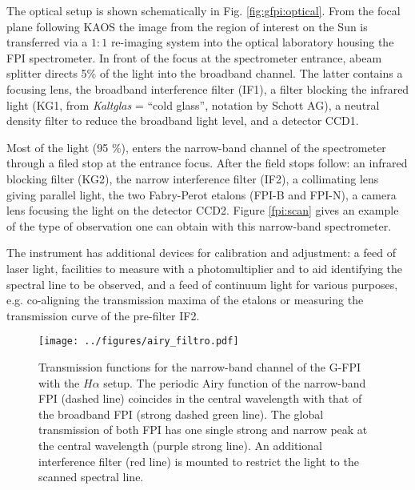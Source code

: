 The optical setup is shown schematically in Fig. \ref{fig:gfpi:optical}. From the focal plane following KAOS the image from the region of interest on the Sun is transferred via a $1:1$ re-imaging system into the optical laboratory housing the FPI spectrometer. In front of the focus at the spectrometer entrance, abeam splitter directs 5\% of the light into the broadband channel. The latter contains a focusing lens, the broadband interference filter (IF1), a filter blocking the infrared light (KG1, from \emph{Kaltglas} = ``cold glass'', notation by Schott AG), a neutral density filter to reduce the broadband light level, and a detector CCD1.


Most of the light (95 \%), enters the narrow-band channel of the spectrometer through a filed stop at the entrance focus. After the field stops follow: an infrared  blocking filter (KG2), the narrow interference filter (IF2), a collimating lens giving parallel light, the two Fabry-Perot etalons (FPI-B and FPI-N), a camera lens focusing the light on the detector CCD2. Figure \ref{fpi:scan} gives an example of the type of observation one can obtain with this narrow-band spectrometer.

The instrument has additional devices for calibration and adjustment: a feed of laser light, facilities to measure with a photomultiplier and to aid identifying the spectral line to be observed, and a feed of continuum light for various purposes, e.g. co-aligning the transmission maxima of the etalons or measuring the transmission curve of the pre-filter IF2.

\begin{figure}[t]
\begin{center}
\texttt{[image: ../figures/airy\_filtro.pdf]}
\caption{Transmission functions for the narrow-band channel of the G-FPI with the $H\alpha$ setup. The periodic Airy function of the narrow-band FPI (dashed line) coincides in the central wavelength with that of the broadband FPI (strong dashed green line). The global transmission of both FPI has one single strong and narrow peak at the central wavelength (purple strong line). An additional interference filter (red line) is mounted to restrict the light to the scanned spectral line.}
\label{fig:gfpi:transimance}
\end{center}
\end{figure}



